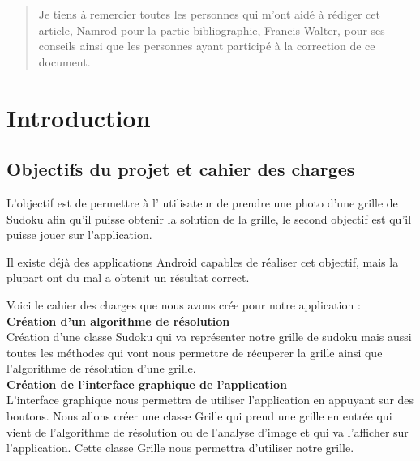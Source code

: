 \documentclass{article}
\begin{document}
\newcommand{\CC}{C\nolinebreak\hspace{-.05em}\raisebox{.4ex}{\tiny\bf +}\nolinebreak\hspace{-.10em}\raisebox{.4ex}{\tiny\bf +}}
\def\CC{{C\nolinebreak[4]\hspace{-.05em}\raisebox{.4ex}{\tiny\bf ++}}}

\newpage
\thispagestyle{empty}
\renewcommand{\abstractname}{Remerciements}
\begin{abstract}
Je tiens à remercier toutes les personnes qui m'ont aidé à rédiger cet article, Namrod pour la partie bibliographie, Francis Walter, pour ses conseils ainsi que les personnes ayant participé à la correction de ce document.
\end{abstract}
\thispagestyle{empty}%

\newpage

\tableofcontents
\newpage
\pagestyle{fancy}
\renewcommand\headrulewidth{1pt}
\section{Introduction}

\subsection{Objectifs du projet et cahier des charges}
L’objectif est de permettre à l' utilisateur de prendre une photo d'une grille de Sudoku afin qu'il puisse 
obtenir la solution de la grille, le second objectif est qu'il puisse jouer sur l'application.

Il existe déjà des applications Android capables de réaliser cet objectif, mais la plupart ont du mal a obtenit un résultat correct.


Voici le cahier des charges que nous avons crée pour notre application :\\

\textbf{ Création d'un algorithme de résolution}\\
Création d'une classe Sudoku qui va représenter notre grille de sudoku mais aussi toutes les méthodes qui vont nous permettre de récuperer la grille ainsi que l'algorithme de résolution d'une grille.\\

\textbf{Création de l'interface graphique de l'application}\\
L'interface graphique nous permettra de utiliser l'application en appuyant sur des boutons.
Nous allons créer une classe Grille qui prend une grille en entrée qui vient de l'algorithme de résolution ou de l'analyse d'image et qui va l'afficher sur l'application. Cette classe Grille nous permettra d'utiliser notre grille.
\\
\end{document}
